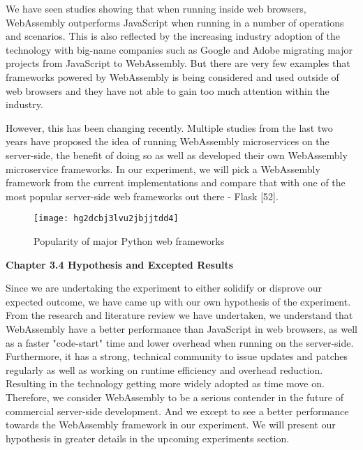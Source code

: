 We have seen studies showing that when running inside web browsers, WebAssembly outperforms JavaScript when running in a number of operations and scenarios. This is also reflected by the increasing industry adoption of the technology with big-name companies such as Google and Adobe migrating major projects from JavaScript to WebAssembly. But there are very few examples that frameworks powered by WebAssembly is being considered and used outside of web browsers and they have not able to gain too much attention within the industry.

However, this has been changing recently. Multiple studies from the last two years have proposed the idea of running WebAssembly microservices on the server-side, the benefit of doing so as well as developed their own WebAssembly microservice frameworks. In our experiment, we will pick a WebAssembly framework from the current implementations and compare that with one of the most popular server-side web frameworks out there - Flask [52].

\bigskip
\begin{figure}[hp]
\centering
\texttt{[image: hg2dcbj3lvu2jbjjtdd4]}
\caption{\footnotesize{Popularity of major Python web frameworks}}
\captionsetup{aboveskip=0pt,font=it}
\end{figure}
\bigskip

\bigskip
\bigskip
\textbf{{\Large Chapter 3.4 Hypothesis and Excepted Results}}

Since we are undertaking the experiment to either solidify or disprove our expected outcome, we have came up with our own hypothesis of the experiment. From the research and literature review we have undertaken, we understand that WebAssembly have a better performance than JavaScript in web browsers, as well as a faster "code-start" time and lower overhead when running on the server-side. Furthermore, it has a strong, technical community to issue updates and patches regularly as well as working on runtime efficiency and overhead reduction. Resulting in the technology getting more widely adopted as time move on. Therefore, we consider WebAssembly to be a serious contender in the future of commercial server-side development. And we except to see a better performance towards the WebAssembly framework in our experiment. We will present our hypothesis in greater details in the upcoming experiments section.